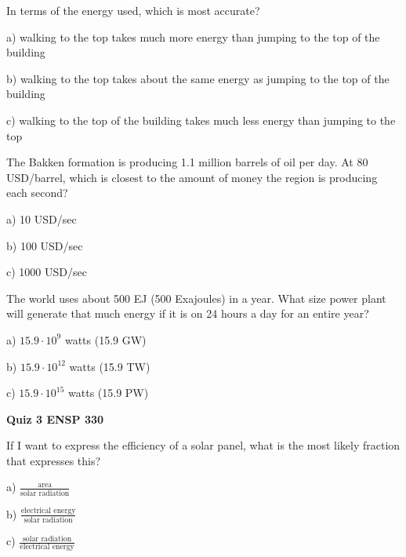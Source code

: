\documentclass[12pt, oneside]{article}
\begin{document}
\problem{}
In terms of the energy used, which is most accurate?

a) walking to the top takes much more energy than jumping to the top of the
building

b) walking to the top takes about the same energy as jumping to the top
of the building

c) walking to the top of the building takes much less energy than
jumping to the top


\problem{}
The Bakken formation is producing 1.1 million barrels of oil per day.
At 80 USD/barrel, which is closest to the amount of money the region is
producing each second?

a) 10 USD/sec

b) 100 USD/sec

c) 1000 USD/sec


\vfill

\problem{}
The world uses about 500 EJ (500 Exajoules) in a year.  What size power
plant will generate that much energy if it is on 24 hours a day for an
entire year?

a) $15.9 \cdot 10^{9}$ watts (15.9 GW)

b) $15.9 \cdot 10^{12}$ watts (15.9 TW)

c) $15.9 \cdot 10^{15}$ watts (15.9 PW)


\vfill

\newpage
\setcounter{problem}{0}
{\bf Quiz 3 \hfill ENSP 330}



If I want to express the efficiency of a solar panel, what is the most
likely fraction that expresses this?

a) $\frac{\textrm{area}}{\textrm{solar radiation}}$

b) $\frac{\textrm{electrical energy}}{\textrm{solar radiation}}$

c) $\frac{\textrm{solar radiation}}{\textrm{electrical energy}}$


\problem{}
\end{document}

